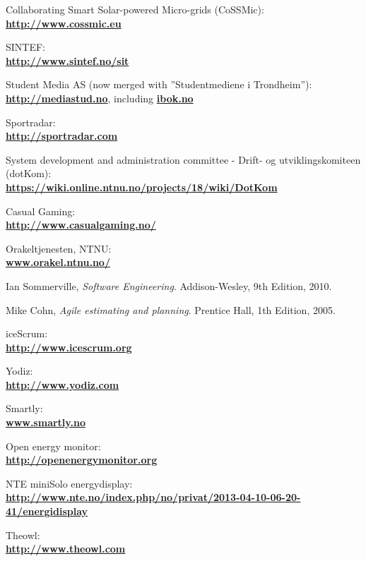 \begin{thebibliography}{1}

 Collaborating Smart Solar-powered Micro-grids (CoSSMic):\\ \textbf{\url{http://www.cossmic.eu}}

 SINTEF: \\
\textbf{ \url{ http://www.sintef.no/sit}}

 Student Media AS (now merged with ''Studentmediene i Trondheim''):\\
\textbf{ \url{http://mediastud.no}}, including \textbf{ \url{ibok.no}}

 Sportradar:\\
\textbf{ \url{http://sportradar.com}}

 System development and administration committee - Drift- og utviklingskomiteen (dotKom):\\
\textbf{ \url{https://wiki.online.ntnu.no/projects/18/wiki/DotKom}}

 Casual Gaming:\\
\textbf{ \url{http://www.casualgaming.no/}}

 Orakeltjenesten, NTNU:\\
\textbf{ \url{www.orakel.ntnu.no/}}

  Ian Sommerville,
  \emph{Software Engineering}.
  Addison-Wesley,
  9th Edition,
  2010.

  Mike Cohn,
  \emph{Agile estimating and planning}.
  Prentice Hall,
  1th Edition,
  2005.

 iceScrum: \\
\textbf{ \url{http://www.icescrum.org}}

 Yodiz: \\
\textbf{ \url{ http://www.yodiz.com}}
        
 Smartly: \\
\textbf{ \url{www.smartly.no}}

 Open energy monitor:\\
\textbf{ \url{http://openenergymonitor.org}}

 NTE miniSolo energydisplay:\\
\textbf{ \url{http://www.nte.no/index.php/no/privat/2013-04-10-06-20-41/energidisplay}}

 Theowl:\\
\textbf{ \url{http://www.theowl.com}}



\end{thebibliography}
